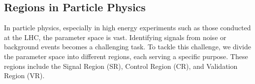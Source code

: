 







% 


\subsection{Regions in Particle Physics}

In particle physics, especially in high energy experiments such as those conducted at the LHC, the parameter space is
vast. Identifying signals from noise or background events becomes a challenging task. To tackle this challenge, we
divide the parameter space into different regions, each serving a specific purpose. These regions include the Signal
Region (SR), Control Region (CR), and Validation Region (VR).

